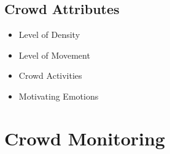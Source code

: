 \subsection{Crowd Attributes}

\begin{itemize}
	\item Level of Density
	\item Level of Movement
	\item Crowd Activities
	\item Motivating Emotions
\end{itemize}

\section{Crowd Monitoring}










